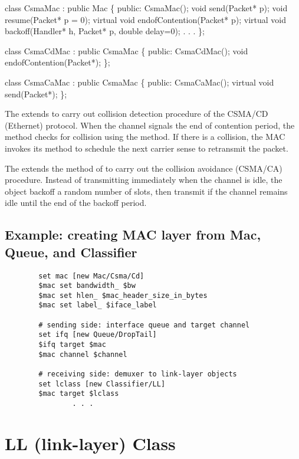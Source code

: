 \begin{program}
    class CsmaMac : public Mac \{
    public:
        CsmaMac();
        void send(Packet* p);
        void resume(Packet* p = 0);
        virtual void endofContention(Packet* p);
        virtual void backoff(Handler* h, Packet* p, double delay=0);
                . . .
    \};

    class CsmaCdMac : public CsmaMac \{
    public:
        CsmaCdMac();
        void endofContention(Packet*);
    \};

    class CsmaCaMac : public CsmaMac \{
    public:
        CsmaCaMac();
        virtual void send(Packet*);
    \};
\end{program}

The  extends  to carry out collision
detection procedure of the CSMA/CD (Ethernet) protocol.  When the
channel signals the end of contention period, the 
method checks for collision using the 
method.  If there is a collision, the MAC invokes its 
method to schedule the next carrier sense to retransmit the packet.

The  extends the  method of  to
carry out the collision avoidance (CSMA/CA) procedure.  Instead of
transmitting immediately when the channel is idle, the 
object backoff a random number of slots, then transmit if the channel
remains idle until the end of the backoff period.

\subsection{Example:  creating MAC layer from Mac, Queue, and Classifier}
\label{ex:maclayer}

\begin{verbatim}
        set mac [new Mac/Csma/Cd]
        $mac set bandwidth_ $bw
        $mac set hlen_ $mac_header_size_in_bytes
        $mac set label_ $iface_label

        # sending side: interface queue and target channel
        set ifq [new Queue/DropTail]
        $ifq target $mac
        $mac channel $channel

        # receiving side: demuxer to link-layer objects
        set lclass [new Classifier/LL]
        $mac target $lclass
                . . .
\end{verbatim}


\section{LL (link-layer) Class}
\label{sec:linklayer}

